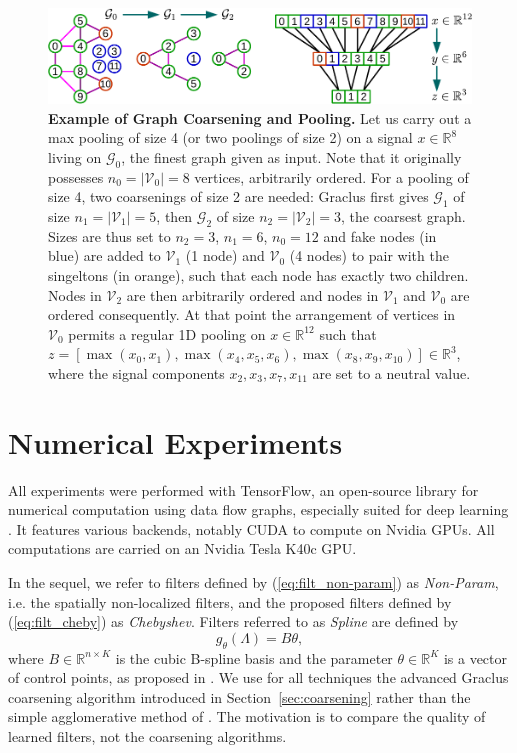 \documentclass{article}
\newcommand{\G}{\mathcal{G}}
\newcommand{\V}{\mathcal{V}}
\newcommand{\R}{\mathbb{R}}
\newcommand{\secref}[1]{Section~\ref{sec:#1}}
\newcommand{\eqnref}[1]{(\ref{eq:#1})}
\newcommand{\bruna}{art:BrunaZarembaSzlamLeCun13DLgraphs,
art:HenaffBrunaLeCun15DLgraphs}
\begin{document}
\begin{figure}[ht]
\vspace{0.5cm}
\centering
\includegraphics[width=\textwidth]{images/coarsening_crop}
\caption{\textbf{Example of Graph Coarsening and Pooling.} Let us carry out a max pooling of size 4 (or two poolings of size 2) on a signal $x \in
\R^8$ living on $\G_0$, the finest graph given as input. Note that it originally
possesses $n_0 = |\V_0| = 8$ vertices, arbitrarily ordered. For a pooling of
size 4, two coarsenings of size 2 are needed: Graclus first gives $\G_1$ of size
$n_1 = |\V_1| = 5$, then $\G_2$ of size $n_2 = |\V_2| = 3$, the coarsest graph.
Sizes are thus set to $n_2 = 3$, $n_1 = 6$, $n_0 = 12$ and fake nodes (in blue)
are added to $\V_1$ (1 node) and $\V_0$ (4 nodes) to pair with the singeltons
(in orange), such that each node has exactly two children.  Nodes in $\V_2$ are
then arbitrarily ordered and nodes in $\V_1$ and $\V_0$ are ordered
consequently.  At that point the arrangement of vertices in $\V_0$ permits a
regular 1D pooling on $x \in \R^{12}$ such that $z = [\max(x_0,x_1),
\max(x_4,x_5,x_6), \max(x_8,x_9,x_{10})] \in \R^3$, where the signal components
$x_2,x_3,x_7,x_{11}$ are set to a neutral value.}
\label{fig:pooling}
\end{figure}














\section{Numerical Experiments}
All experiments were performed with TensorFlow, an open-source library for
numerical computation using data flow graphs, especially suited for deep
learning \cite{abadi_tensorflow_2016}. It features various backends, notably
CUDA to compute on Nvidia GPUs. All computations are carried on an Nvidia Tesla
K40c GPU.

In the sequel, we refer to filters defined by \eqnref{filt_non-param} as
\textit{Non-Param}, i.e. the spatially non-localized filters, and the proposed filters defined by \eqnref{filt_cheby} as
\textit{Chebyshev}. Filters referred to as \textit{Spline} are defined by
\begin{equation} \label{eq:filt_spline}
	g_\theta(\Lambda) = B \theta,
\end{equation}
where $B \in \R^{n \times K}$ is the cubic B-spline basis and the parameter
$\theta \in \R^K$ is a vector of control points, as proposed in \cite{\bruna}. We use for all techniques the advanced Graclus
coarsening algorithm introduced in \secref{coarsening} rather than the simple
agglomerative method of \cite{\bruna}. The motivation is to compare
the quality of learned filters, not the coarsening algorithms.
\end{document}
